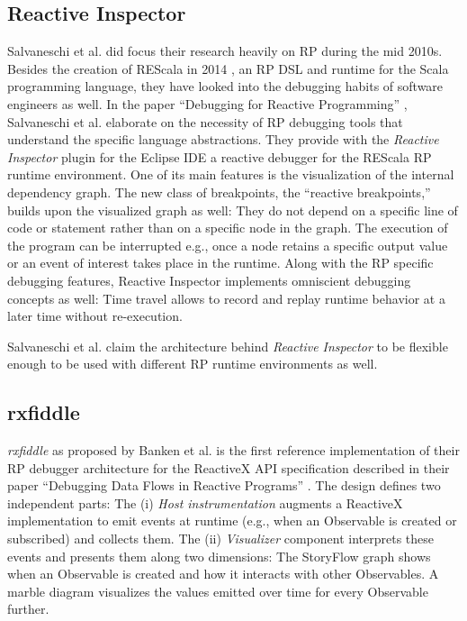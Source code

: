 \documentclass[12pt,a4paper]{article}
\begin{document}
\subsection{Reactive Inspector}

Salvaneschi et al. did focus their research heavily on RP during the mid 2010s. Besides the creation of REScala in 2014 \cite{10.1145/2577080.2577083}, an RP DSL and runtime for the Scala programming language, they have looked into the debugging habits of software engineers as well. In the paper ``Debugging for Reactive Programming'' \cite{10.1145/2884781.2884815}, Salvaneschi et al. elaborate on the necessity of RP debugging tools that understand the specific language abstractions. They provide with the \emph{Reactive Inspector} plugin for the Eclipse IDE a reactive debugger for the REScala RP runtime environment. One of its main features is the visualization of the internal dependency graph. The new class of  breakpoints, the ``reactive breakpoints,'' builds upon the visualized graph as well: They do not depend on a specific line of code or statement rather than on a specific node in the graph. The execution of the program can be interrupted e.g., once a node retains a specific output value or an event of interest takes place in the runtime. Along with the RP specific debugging features, Reactive Inspector implements omniscient debugging concepts as well: Time travel allows to record and replay runtime behavior at a later time without re-execution.

Salvaneschi et al. claim\cite{10.1145/2577080.2577083} the architecture behind \emph{Reactive Inspector} to be flexible enough to be used with different RP runtime environments as well.

\subsection{rxfiddle}

\emph{rxfiddle} as proposed by Banken et al. is the first reference implementation of their RP debugger architecture for the ReactiveX API specification described in their paper ``Debugging Data Flows in Reactive Programs'' \cite{10.1145/3180155.3180156}. The design defines two independent parts: The (i) \emph{Host instrumentation} augments a ReactiveX implementation to emit events at runtime (e.g., when an Observable is created or subscribed) and collects them. The (ii) \emph{Visualizer} component interprets these events and presents them along two dimensions: The StoryFlow graph \cite{YWu2013a} shows when an Observable is created and how it interacts with other Observables. A marble diagram visualizes the values emitted over time for every Observable further.
\end{document}
